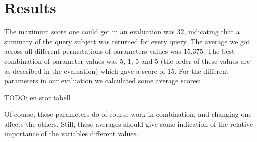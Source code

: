 
\chapter{Results}

The maximum score one could get in an evaluation was 32, indicating that a summary of the query subject was returned for every query. The average we got across all different permutations of parameters values was 15.375. The best combination of parameter values was 5, 1, 5 and 5 (the order of these values are as described in the evaluation) which gave a score of 15. For the different parameters in our evaluation we calculated some average scores:

TODO: en stor tabell

Of course, these parameters do of course work in combination, and changing one affects the others. Still, these averages should give some indication of the relative importance of the variables different values.